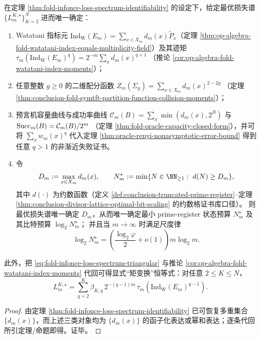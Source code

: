 \begin{corollary}\label{cor:fold-infonce-loss-spectrum-determines-index-tqft-capacity}
在定理 \ref{thm:fold-infonce-loss-spectrum-identifiability} 的设定下，给定最优损失谱 \(\{L_m^{K,\star}\}_{K=2}^{N}\) 进而唯一确定：
\begin{enumerate}
\normalfont
  \item Watatani 指标元 \(\mathrm{Ind}_{\mathrm W}(E_m)=\sum_{x\in X_m}d_m(x)\widetilde P_x\)（定理 \ref{thm:op-algebra-fold-watatani-index-equals-multiplicity-field}）及其迹矩
  \(
  \tau_m(\mathrm{Ind}_{\mathrm W}(E_m)^q)=2^{-m}\sum_x d_m(x)^{q+1}
  \)
  （推论 \ref{cor:op-algebra-fold-watatani-index-moments}）；
  \item 任意整数 \(g\ge 0\) 的二维配分函数
  \(
  Z_m(\Sigma_g)=\sum_{x\in X_m}d_m(x)^{2-2g}
  \)
  （定理 \ref{thm:conclusion-fold-symtft-partition-function-collision-moments}）；
  \item 预言机容量曲线与成功率曲线
  \(
  \mathcal{C}_m(B)=\sum_x \min(d_m(x),2^B)
  \)
  与 \({\rm Succ}_m(B)=\mathcal{C}_m(B)/2^m\)
  （定理 \ref{thm:fold-oracle-capacity-closed-form}），并可将 \(\sum_x w_m(x)^q\) 代入定理 \ref{thm:oracle-renyi-nonasymptotic-error-bound} 得到任意 \(q>1\) 的非渐近失败证书。
  \item 令
  \[
  D_m:=\max_{x\in X_m}d_m(x),
  \qquad
  N_m^\star:=\min\{N\in\NN_{\ge 1}:\ d(N)\ge D_m\},
  \]
  其中 \(d(\cdot)\) 为约数函数（定义 \ref{def:conclusion-truncated-prime-register}--定理 \ref{thm:conclusion-divisor-lattice-optimal-bit-scaling} 的约数格证书库口径）。
  则最优损失谱唯一确定 \(D_m\)，从而唯一确定最小 prime-register 状态预算 \(N_m^\star\) 及其比特预算 \(\log_2 N_m^\star\)；
  并且当 \(m\to\infty\) 时满足尺度律
  \[
  \log_2 N_m^\star
  =\left(\frac{\log_2\varphi}{2}+o(1)\right)m\log_2 m.
  \]
\end{enumerate}
\par
此外，把 \eqref{eq:fold-infonce-loss-spectrum-triangular} 与推论 \ref{cor:op-algebra-fold-watatani-index-moments} 代回可得显式“矩变换”恒等式：对任意 \(2\le K\le N\)，
\[
L_m^{K,\star}
=\sum_{q=2}^{K}\beta_{K,q}\,2^{-(q-1)m}\,\tau_m\!\left(\mathrm{Ind}_{\mathrm W}(E_m)^{q-1}\right).
\]
\end{corollary}
\begin{proof}
由定理 \ref{thm:fold-infonce-loss-spectrum-identifiability} 已可恢复多重集合 \(\{d_m(x)\}\)，而上述三类对象均为 \(\{d_m(x)\}\) 的函子化表达或幂和表达；逐条代回所引定理/命题即得。证毕。
\end{proof}
